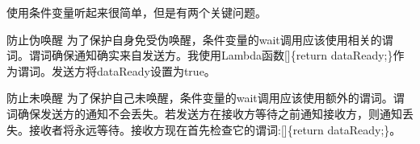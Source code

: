 
使用条件变量听起来很简单，但是有两个关键问题。

\begin{myWarning}{防止伪唤醒}
为了保护自身免受伪唤醒，条件变量的wait调用应该使用相关的谓词。谓词确保通知确实来自发送方。我使用Lambda函数[]\{return dataReady;\}作为谓词。发送方将dataReady设置为true。
\end{myWarning}



\begin{myWarning}{防止未唤醒}
为了保护自己未唤醒，条件变量的wait调用应该使用额外的谓词。谓词确保发送方的通知不会丢失。若发送方在接收方等待之前通知接收方，则通知丢失。接收者将永远等待。接收方现在首先检查它的谓词:[]\{return dataReady;\}。
\end{myWarning}
